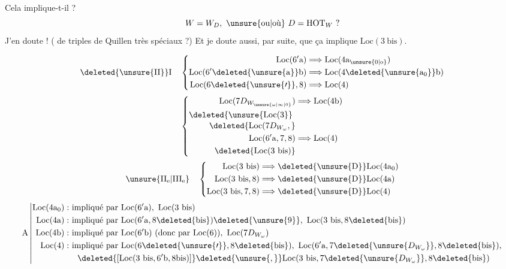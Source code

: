Cela implique-t-il  ?
\[
W=W_D,\ \text{\unsure{ou|où} }D=\mathrm{HOT}_{W}\ ?
\]
J'en doute ! ( de triples de Quillen très spéciaux ?)
Et je doute aussi, par suite, que ça implique $\mathrm{Loc}(3\ \mathrm{bis})$.

\[
\deleted{\unsure{\mathrm{II}}}\mathrm{I}\quad
\left\{\begin{aligned}
\mathrm{Loc}(6'\mathrm{a})&\Longrightarrow\mathrm{Loc}(4\mathrm{a}_{\unsure{0|\mathrm{o}}})\\
\mathrm{Loc}(6'\deleted{\unsure{\mathrm{a}}}\mathrm{b})&\Longrightarrow\mathrm{Loc}(4\deleted{\unsure{\mathrm{a}_{0}}}\mathrm{b})\\
\mathrm{Loc}(6\deleted{\unsure{\prime}},8)&\Longrightarrow\mathrm{Loc}(4)
\end{aligned}\right.
\]
\[
\left\{\begin{aligned}
\mathrm{Loc}(7D_{W_{\unsure{\omega|\infty|0}}})&\Longrightarrow\mathrm{Loc}(4\mathrm{b})\\
\deleted{\unsure{\mathrm{Loc}(3}}\ &\\[-2pt]
\deleted{\mathrm{Loc}(7D_{W_{\omega}},} &\\
\mathrm{Loc}(6'\mathrm{a},7,8)&\Longrightarrow\mathrm{Loc}(4)\\
\deleted{\mathrm{Loc}(3\ \mathrm{bis})}&
\end{aligned}\right.
\]
\[
\unsure{\mathrm{II}_{\mathrm{e}}|\mathrm{III}_{\mathrm{e}}}\quad
\left\{\begin{aligned}
\mathrm{Loc}(3\ \mathrm{bis})&\Longrightarrow\deleted{\unsure{\mathrm{D}}}\mathrm{Loc}(4\mathrm{a}_{0})\\
\mathrm{Loc}(3\ \mathrm{bis},8)&\Longrightarrow\deleted{\unsure{\mathrm{D}}}\mathrm{Loc}(4\mathrm{a})\\
\mathrm{Loc}(3\ \mathrm{bis},7,8)&\Longrightarrow\deleted{\unsure{\mathrm{D}}}\mathrm{Loc}(4)
\end{aligned}\right.
\]
\[
\mathrm A\left|\begin{aligned}
\mathrm{Loc}(4\mathrm{a}_{0}):&\ \text{impliqué par }\mathrm{Loc}(6'\mathrm{a}),\ \mathrm{Loc}(3\ \mathrm{bis})\\
\mathrm{Loc}(4\mathrm{a}):&\ \text{impliqué par }\mathrm{Loc}(6'\mathrm{a},8\deleted{\mathrm{bis}})\deleted{\unsure{9}},\ \mathrm{Loc}(3\ \mathrm{bis},8\deleted{\mathrm{bis}})\\
\mathrm{Loc}(4\mathrm{b}):&\ \text{impliqué par }\mathrm{Loc}(6'\mathrm{b})\ (\text{donc par }\mathrm{Loc}(6)),\ \mathrm{Loc}(7D_{W_{\omega}})\\
\mathrm{Loc}(4):&\ \text{impliqué par }\mathrm{Loc}(6\deleted{\unsure{\prime}},8\deleted{\mathrm{bis}}),\
\mathrm{Loc}(6'\mathrm{a},7\deleted{\unsure{D_{W_{\omega}}}},8\deleted{\mathrm{bis}}),\\
&\quad\deleted{[\mathrm{Loc}(3\ \mathrm{bis},6'\mathrm{b},8\mathrm{bis})]}\deleted{\unsure{,}}
\mathrm{Loc}(3\ \mathrm{bis},7\deleted{\unsure{D_{W_{\omega}}}},8\deleted{\mathrm{bis}})
\end{aligned}\right.
\]
